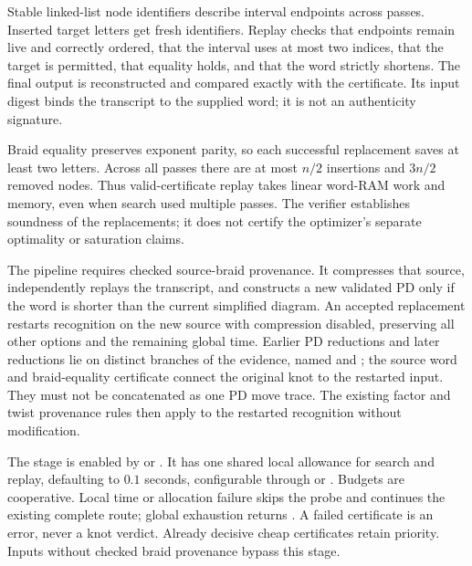 Stable linked-list node identifiers describe interval endpoints across
passes. Inserted target letters get fresh identifiers. Replay checks that
endpoints remain live and correctly ordered, that the interval uses at
most two indices, that the target is permitted, that equality holds, and
that the word strictly shortens. The final output is reconstructed and
compared exactly with the certificate. Its input digest binds the
transcript to the supplied word; it is not an authenticity signature.

Braid equality preserves exponent parity, so each successful replacement
saves at least two letters. Across all passes there are at most $n/2$
insertions and $3n/2$ removed nodes. Thus valid-certificate replay takes
linear word-RAM work and memory, even when search used multiple passes.
The verifier establishes soundness of the replacements; it does not
certify the optimizer's separate optimality or saturation claims.

The pipeline requires checked source-braid provenance. It compresses that
source, independently replays the transcript, and constructs a new validated
PD only if the word is shorter than the current simplified diagram. An
accepted replacement restarts recognition on the new source with compression
disabled, preserving all other options and the remaining global time.
Earlier PD reductions and later reductions lie on distinct branches of
the evidence, named  and ; the
source word and braid-equality certificate connect the original knot to
the restarted input. They must not be concatenated as one PD move trace.
The existing factor and twist provenance rules then apply to the restarted
recognition without modification.

The stage is enabled by  or .
It has one shared local allowance for search and replay, defaulting to
$0.1$ seconds, configurable through  or
. Budgets are cooperative. Local time or allocation
failure skips the probe and continues the existing complete route;
global exhaustion returns . A failed certificate is an error,
never a knot verdict. Already decisive cheap certificates retain priority.
Inputs without checked braid provenance bypass this stage.

